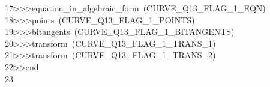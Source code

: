 \begin{tabbing}
17\>$\triangleright$\>$\triangleright$\>$\triangleright$\>equation\_in\_algebraic\_form\ (CURVE\_Q13\_FLAG\_1\_EQN)\ \\[0pt]
18\>$\triangleright$\>$\triangleright$\>$\triangleright$\>points\ (CURVE\_Q13\_FLAG\_1\_POINTS)\ \\[0pt]
19\>$\triangleright$\>$\triangleright$\>$\triangleright$\>bitangents\ (CURVE\_Q13\_FLAG\_1\_BITANGENTS)\ \\[0pt]
20\>$\triangleright$\>$\triangleright$\>$\triangleright$\>transform\ (CURVE\_Q13\_FLAG\_1\_TRANS\_1)\ \\[0pt]
21\>$\triangleright$\>$\triangleright$\>$\triangleright$\>transform\ (CURVE\_Q13\_FLAG\_1\_TRANS\_2)\ \\[0pt]
22\>$\triangleright$\>$\triangleright$\>end\\[0pt]
23\>\end{tabbing}
